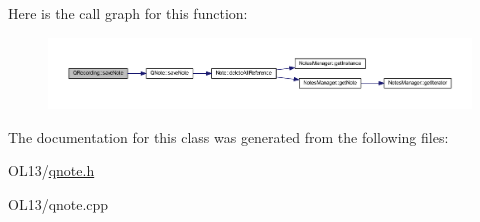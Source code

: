 Here is the call graph for this function\+:\nopagebreak
\begin{figure}[H]
\begin{center}
\leavevmode
\includegraphics[width=350pt]{class_q_recording_a37492f3dbda2dad2a8cd62012fe91b78_cgraph}
\end{center}
\end{figure}


The documentation for this class was generated from the following files\+:\begin{DoxyCompactItemize}
\item 
O\+L13/\hyperlink{qnote_8h}{qnote.\+h}\item 
O\+L13/qnote.\+cpp\end{DoxyCompactItemize}
